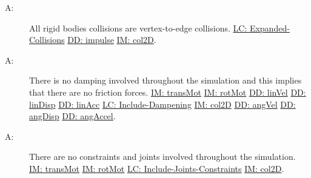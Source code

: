 \documentclass[12pt]{article}
\newcounter{assumpnum}
\newcommand{\atheassumpnum}{A\theassumpnum}
\begin{document}
\begin{description}
\item[\atheassumpnum\label{A:collisionType}:]All rigid bodies collisions are vertex-to-edge collisions. \hyperref[lcEC]{LC: Expanded-Collisions} \hyperref[DD:impulse]{DD: impulse} \hyperref[IM:col2D]{IM: col2D}.
\end{description}
\begin{description}
\item[\atheassumpnum\label{A:dampingInvolvement}:]There is no damping involved throughout the simulation and this implies that there are no friction forces. \hyperref[IM:transMot]{IM: transMot} \hyperref[IM:rotMot]{IM: rotMot} \hyperref[DD:linVel]{DD: linVel} \hyperref[DD:linDisp]{DD: linDisp} \hyperref[DD:linAcc]{DD: linAcc} \hyperref[lcID]{LC: Include-Dampening} \hyperref[IM:col2D]{IM: col2D} \hyperref[DD:angVel]{DD: angVel} \hyperref[DD:angDisp]{DD: angDisp} \hyperref[DD:angAccel]{DD: angAccel}.
\end{description}
\begin{description}
\item[\atheassumpnum\label{A:constraintsAndJointsInvolvement}:]There are no constraints and joints involved throughout the simulation. \hyperref[IM:transMot]{IM: transMot} \hyperref[IM:rotMot]{IM: rotMot} \hyperref[lcIJC]{LC: Include-Joints-Constraints} \hyperref[IM:col2D]{IM: col2D}.
\end{description}
\end{document}
